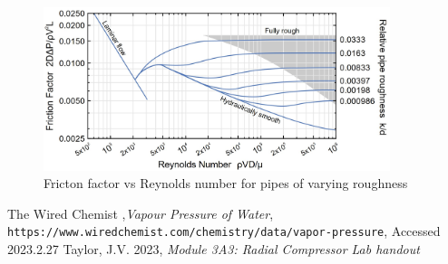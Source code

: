 \documentclass{article}
\begin{document}
\begin{figure}[H]
    \centering
    \includegraphics[width=0.9\textwidth]{re_roughness.jpg}
    \caption{Fricton factor vs Reynolds number for pipes of varying roughness \cite{handout}}
    \label{fig:Re_vs_friction_factor}
\end{figure}

\begin{thebibliography}{9}
    The Wired Chemist ,\textit{Vapour Pressure of Water}, \texttt{https://www.wiredchemist.com/chemistry/data/vapor-pressure}, Accessed 2023.2.27
    Taylor, J.V. 2023, \textit{Module 3A3: Radial Compressor Lab handout}
\end{thebibliography}
\end{document}
